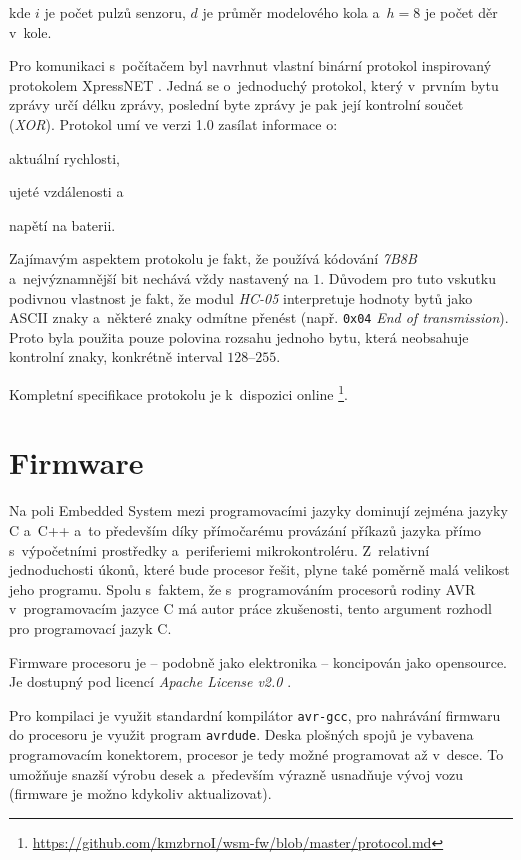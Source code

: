 kde $i$ je počet pulzů senzoru, $d$ je průměr modelového kola a~$h = 8$ je počet děr
v~kole.

Pro komunikaci s~počítačem byl navrhnut vlastní binární protokol inspirovaný
protokolem XpressNET \cite{xpressnet-specs}. Jedná se o~jednoduchý protokol, který
v~prvním bytu zprávy určí délku zprávy, poslední byte zprávy je pak její
kontrolní součet (\textit{XOR}). Protokol umí ve verzi 1.0 zasílat informace o:

\begin{compactenum}
\item aktuální rychlosti,
\item ujeté vzdálenosti a
\item napětí na baterii.
\end{compactenum}

Zajímavým aspektem protokolu je fakt, že používá kódování \textit{7B8B}
a~nejvýznamnější bit nechává vždy nastavený na $1$. Důvodem pro tuto vskutku podivnou
vlastnost je fakt, že modul \textit{HC-05} interpretuje hodnoty bytů jako
ASCII znaky a~některé znaky odmítne přenést (např. \texttt{0x04} \textit{End
of transmission}). Proto byla použita pouze polovina rozsahu jednoho
bytu, která neobsahuje kontrolní znaky, konkrétně interval $128$--$255$.

Kompletní specifikace protokolu je k~dispozici online
\footnote{\url{https://github.com/kmzbrnoI/wsm-fw/blob/master/protocol.md}}.

\section{Firmware}
\label{sec:wsm-fw}

Na poli Embedded System mezi programovacími jazyky dominují zejména jazyky C
a~C++ a~to především díky přímočarému provázání příkazů jazyka přímo
s~výpočetními prostředky a~periferiemi mikrokontroléru. Z~relativní
jednoduchosti úkonů, které bude procesor řešit, plyne také poměrně malá
velikost jeho programu. Spolu s~faktem, že s~programováním procesorů rodiny
AVR v~programovacím jazyce C má autor práce zkušenosti, tento argument rozhodl
pro programovací jazyk C.

Firmware procesoru je -- podobně jako elektronika -- koncipován jako
opensource. Je dostupný pod licencí \textit{Apache License v2.0} \cite{wsm-fw}.

Pro kompilaci je využit standardní kompilátor \texttt{avr-gcc}, pro nahrávání
firmwaru do procesoru je využit program \texttt{avrdude}. Deska
plošných spojů je vybavena programovacím konektorem, procesor je tedy možné
programovat až v~desce. To umožňuje snazší výrobu desek a~především výrazně
usnadňuje vývoj vozu (firmware je možno kdykoliv aktualizovat).

